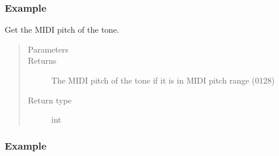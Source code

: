 \documentclass[letterpaper,10pt,english]{sphinxmanual}
\begin{document}
\begin{fulllineitems}
\begin{fulllineitems}
\subsubsection*{Example}

\begin{sphinxVerbatim}[commandchars=\\\{\}]
  
  
 
\end{sphinxVerbatim}

\end{fulllineitems}



\begin{fulllineitems}
\sphinxAtStartPar
Get the MIDI pitch of the tone.
\begin{quote}\begin{description}
\item[{Parameters}] \leavevmode
\sphinxAtStartPar
{} \textendash{} 

\item[{Returns}] \leavevmode
\sphinxAtStartPar
The MIDI pitch of the tone if it is in MIDI pitch range (0\textendash{}128)

\item[{Return type}] \leavevmode
\sphinxAtStartPar
int

\end{description}\end{quote}
\subsubsection*{Example}

\begin{sphinxVerbatim}[commandchars=\\\{\}]
  
\end{sphinxVerbatim}


\end{fulllineitems}
\end{fulllineitems}
\end{document}
